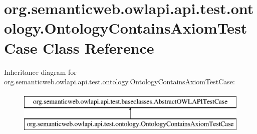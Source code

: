 \hypertarget{classorg_1_1semanticweb_1_1owlapi_1_1api_1_1test_1_1ontology_1_1_ontology_contains_axiom_test_case}{\section{org.\-semanticweb.\-owlapi.\-api.\-test.\-ontology.\-Ontology\-Contains\-Axiom\-Test\-Case Class Reference}
\label{classorg_1_1semanticweb_1_1owlapi_1_1api_1_1test_1_1ontology_1_1_ontology_contains_axiom_test_case}
}
Inheritance diagram for org.\-semanticweb.\-owlapi.\-api.\-test.\-ontology.\-Ontology\-Contains\-Axiom\-Test\-Case\-:\begin{figure}[H]
\begin{center}
\leavevmode
\includegraphics[height=2.000000cm]{classorg_1_1semanticweb_1_1owlapi_1_1api_1_1test_1_1ontology_1_1_ontology_contains_axiom_test_case}
\end{center}
\end{figure}
